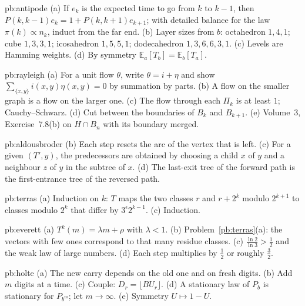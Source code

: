 \begin{hint}{pb:antipode}
(a) If $e_k$ is the expected time to go from $k$ to $k-1$, then $P(k,k-1)e_k=1+P(k,k+1)e_{k+1}$; with detailed balance for the law $\pi(k)\propto n_k$,
induct from the far end. (b) Layer sizes from $b$: octahedron $1,4,1$; cube $1,3,3,1$;
icosahedron $1,5,5,1$; dodecahedron $1,3,6,6,3,1$. (c) Levels are Hamming weights. (d) By symmetry $\mathbb E_a[T_b]=\mathbb E_b[T_a]$.
\end{hint}

\begin{hint}{pb:rayleigh}
(a) For a unit flow $\theta$, write $\theta=i+\eta$ and show $\sum_{\{x,y\}}i(x,y)\eta(x,y)=0$ by summation by parts. (b) A flow on the smaller graph is a flow on
the larger one. (c) The flow through each $\Pi_k$ is at least $1$; Cauchy--Schwarz. (d) Cut between the boundaries of $B_k$ and $B_{k+1}$. (e) Volume~3,
Exercise~7.8(b) on $H\cap B_n$ with its boundary merged.
\end{hint}

\begin{hint}{pb:aldousbroder}
(b) Each step resets the arc of the vertex that is left. (c) For a given $(T',y)$, the predecessors are obtained by choosing a child $x$ of $y$ and a
neighbour $z$ of $y$ in the subtree of $x$. (d) The last-exit tree of the forward path is the first-entrance tree of the reversed path.
\end{hint}

\begin{hint}{pb:terras}
(a) Induction on $k$: $T$ maps the two classes $r$ and $r+2^k$ modulo $2^{k+1}$ to classes modulo $2^k$ that differ by $3^{\epsilon}2^{k-1}$. (c) Induction.
\end{hint}

\begin{hint}{pb:everett}
(a) $T^k(m)=\lambda m+\rho$ with $\lambda<1$. (b) Problem~\ref{pb:terras}(a): the vectors with few ones correspond to that many residue classes. (c) $\frac{\ln2}{\ln3}>\frac12$ and the
weak law of large numbers. (d) Each step multiplies by $\frac12$ or roughly $\frac32$.
\end{hint}

\begin{hint}{pb:holte}
(a) The new carry depends on the old one and on fresh digits. (b) Add $m$ digits at a time. (c) Couple: $D_r=\lfloor BU_r\rfloor$. (d) A stationary law of
$P_b$ is stationary for $P_{b^m}$; let $m\to\infty$. (e) Symmetry $U\mapsto1-U$.
\end{hint}

